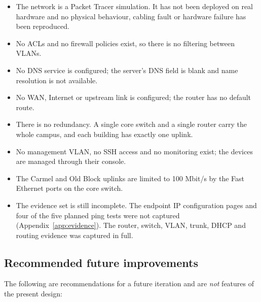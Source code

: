 \documentclass[11pt,a4paper]{article}
\begin{document}
\begin{itemize}
  \item The network is a Packet Tracer simulation. It has not been deployed on real
        hardware and no physical behaviour, cabling fault or hardware failure has been
        reproduced.
  \item No ACLs and no firewall policies exist, so there is no filtering between
        VLANs.
  \item No DNS service is configured; the server's DNS field is blank and name
        resolution is not available.
  \item No WAN, Internet or upstream link is configured; the router has no default
        route.
  \item There is no redundancy. A single core switch and a single router carry the whole
        campus, and each building has exactly one uplink.
  \item No management VLAN, no SSH access and no monitoring exist; the devices are
        managed through their console.
  \item The Carmel and Old Block uplinks are limited to 100 Mbit/s by the Fast
        Ethernet ports on the core switch.
  \item The evidence set is still incomplete. The endpoint IP configuration pages and
        four of the five planned ping tests were not captured
        (Appendix~\ref{app:evidence}). The router, switch, VLAN, trunk, DHCP and
        routing evidence was captured in full.
\end{itemize}

\subsection{Recommended future improvements}

\noindent
The following are recommendations for a future iteration and are \emph{not} features of
the present design:
\end{document}
